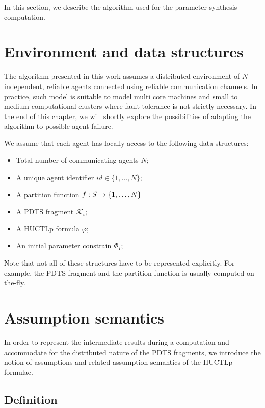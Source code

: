 In this section, we describe the algorithm used for the parameter synthesis computation.

\section{Environment and data structures}

The algorithm presented in this work assumes a distributed environment of $N$ independent, reliable agents connected using reliable communication channels. In practice, such model is suitable to model multi core machines and small to medium computational clusters where fault tolerance is not strictly necessary. In the end of this chapter, we will shortly explore the possibilities of adapting the algorithm to possible agent failure. 

We assume that each agent has locally access to the following data structures:

\begin{itemize}
	\item Total number of communicating agents $N$;
	\item A unique agent identifier $id \in \{ 1, \ldots, N \}$;
	\item A partition function $f : \mathit{S} \to \{1, \ldots, N \}$
	\item A \ac{PDTS} fragment $\mathcal{K}_i$;
	\item A \ac{HUCTLp} formula $\varphi$;
	\item An initial parameter constrain $\Phi_I$;
\end{itemize}

Note that not all of these structures have to be represented explicitly. For example, the \ac{PDTS} fragment and the partition function is usually computed on-the-fly.

\section{Assumption semantics}

In order to represent the intermediate results during a computation and accommodate for the distributed nature of the \ac{PDTS} fragments, we introduce the notion of assumptions and related assumption semantics of the \ac{HUCTLp} formulae.

\subsection{Definition}

